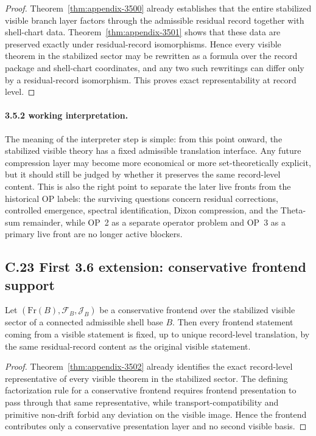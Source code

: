 \begin{proof}
Theorem~\ref{thm:appendix-3500} already establishes that the entire stabilized visible branch layer factors through the admissible residual record together with shell-chart data. Theorem~\ref{thm:appendix-3501} shows that these data are preserved exactly under residual-record isomorphisms. Hence every visible theorem in the stabilized sector may be rewritten as a formula over the record package and shell-chart coordinates, and any two such rewritings can differ only by a residual-record isomorphism. This proves exact representability at record level.
\end{proof}

\paragraph{3.5.2 working interpretation.}
The meaning of the interpreter step is simple: from this point onward, the stabilized visible theory has a fixed admissible translation interface. Any future compression layer may become more economical or more set-theoretically explicit, but it should still be judged by whether it preserves the same record-level content. This is also the right point to separate the later live fronts from the historical OP labels: the surviving questions concern residual corrections, controlled emergence, spectral identification, Dixon compression, and the Theta-sum remainder, while OP~2 as a separate operator problem and OP~3 as a primary live front are no longer active blockers.



\subsection*{C.23 First 3.6 extension: conservative frontend support}

\begin{theorem}
\label{thm:appendix-3600}
Let $(\mathrm{Fr}(B),\mathcal F_B,\mathcal J_B)$ be a conservative frontend over the stabilized visible sector of a connected admissible shell base $B$. Then every frontend statement coming from a visible statement is fixed, up to unique record-level translation, by the same residual-record content as the original visible statement.
\end{theorem}

\begin{proof}
Theorem~\ref{thm:appendix-3502} already identifies the exact record-level representative of every visible theorem in the stabilized sector. The defining factorization rule for a conservative frontend requires frontend presentation to pass through that same representative, while transport-compatibility and primitive non-drift forbid any deviation on the visible image. Hence the frontend contributes only a conservative presentation layer and no second visible basis.
\end{proof}

